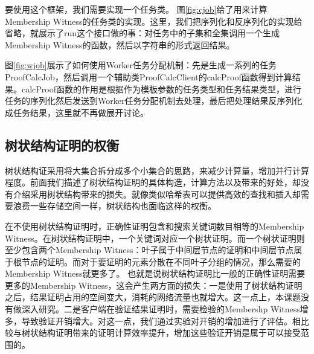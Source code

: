 要使用这个框架，我们需要实现一个任务类。
图\ref{fig:cjob}给了用来计算Membership Witness的任务类的实现。这里，我们把序列化和反序列化的实现给省略，就展示了run这个接口做的事：对任务中的子集和全集调用一个生成Membership Witness的函数，然后以字符串的形式返回结果。


图\ref{fig:wjob}展示了如何使用Worker任务分配机制：先是生成一系列的任务ProofCalcJob，然后调用一个辅助类ProofCalcClient的calcProof函数得到计算结果。calcProof函数的作用是根据作为模板参数的任务类型和任务结果类型，进行任务的序列化然后发送到Worker任务分配机制去处理，最后把处理结果反序列化成任务结果，这里就不再做展开讨论。
\subsection{树状结构证明的权衡}
树状结构证采用将大集合拆分成多个小集合的思路，来减少计算量，增加并行计算程度。前面我们描述了树状结构证明的具体构造，计算方法以及带来的好处，却没有介绍采用树状结构带来的损失。就像类似哈希表可以提供高效的查找和插入却需要浪费一些存储空间一样，树状结构也面临这样的权衡。

在不使用树状结构证明时，正确性证明包含和搜索关键词数目相等的Membership Witness。在树状结构证明中，一个关键词对应一个树状证明。而一个树状证明则至少包含两个Membership Witness：叶子属于中间层节点的证明和中间层节点属于根节点的证明。而对于要证明的元素分散在不同叶子分组的情况，那么需要的Membership Witness就更多了。
也就是说树状结构证明比一般的正确性证明需要更多的Membership Witness，这会产生两方面的损失：一是使用了树状结构证明之后，结果证明占用的空间变大，消耗的网络流量也就增大。这一点上，本课题没有做深入研究。二是客户端在验证结果证明时，需要检验的Membershp Witness增多，导致验证开销增大。对这一点，我们通过实验对开销的增加进行了评估。相比较与树状结构证明带来的证明计算效率提升，增加这些验证开销是属于可以接受范围的。

